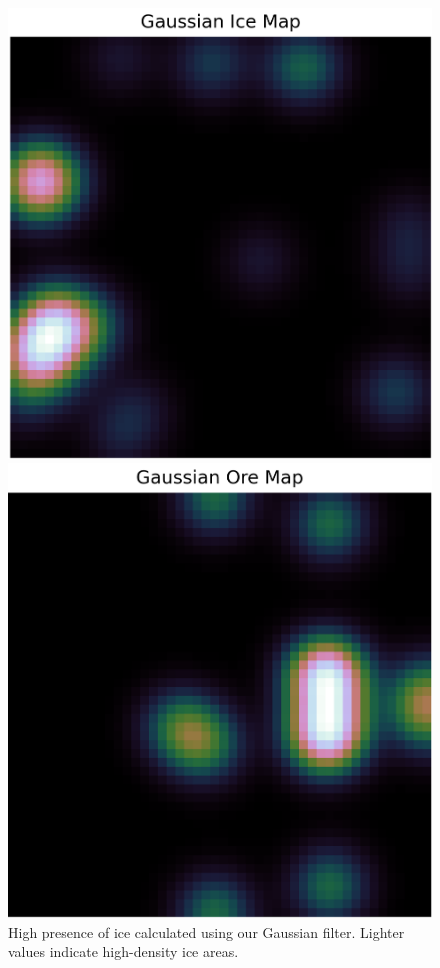 \begin{figure}[htbp]
    \begin{minipage}{0.3\textwidth}
        \centering
        \includegraphics[width=\linewidth]{images/methods_mono/factory_placement/gaussian_ice_map.png}
        \captionsetup{justification=justified, singlelinecheck=false, width=1\linewidth, labelfont=bf} 
        \caption{High presence of ice calculated using our Gaussian filter. Lighter values indicate high-density ice areas.}
        \label{fig:gaussian-ice}
    \end{minipage}\hfill
    \begin{minipage}{0.3\textwidth}
        \centering
        \includegraphics[width=\linewidth]{images/methods_mono/factory_placement/gaussian_ore_map.png}

\end{minipage}
\end{figure}
